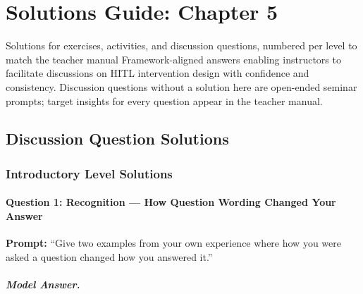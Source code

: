 
\chapter{Solutions Guide: Chapter 5}
\label{ch:solutions-ch05}

\begin{chapterquote}{Solutions for exercises, activities, and discussion questions, numbered per level to match the teacher manual}
Framework-aligned answers enabling instructors to facilitate discussions on HITL intervention design with confidence and consistency. Discussion questions without a solution here are open-ended seminar prompts; target insights for every question appear in the teacher manual.
\end{chapterquote}

\section{Discussion Question Solutions}

\subsection{Introductory Level Solutions}

\subsubsection{Question 1: Recognition --- How Question Wording Changed Your Answer}

\textbf{Prompt:} ``Give two examples from your own experience where how you were asked a question changed how you answered it.''

\paragraph{Model Answer.}

